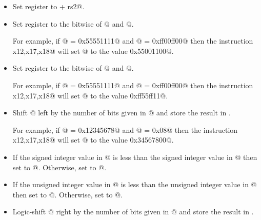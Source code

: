 \begin{itemize}
\item{}
\label{insn:add}

Set register \verb@rd@ to  + rs2@.

\item{}
\label{insn:and}

Set register \verb@rd@ to the bitwise \verb@and@ of @ and  @.

For example, if @ = \verb@0x55551111@ and @ = \verb@0xff00ff00@
then the instruction \verb@xor x12,x17,x18@ will set @ to the
value \verb@0x55001100@.

\item{}
\label{insn:or}

Set register \verb@rd@ to the bitwise \verb@or@ of @ and  @.

For example, if @ = \verb@0x55551111@ and @ = \verb@0xff00ff00@
then the instruction \verb@xor x12,x17,x18@ will set @ to the
value \verb@0xff55ff11@.

\item{}
\label{insn:sll}

Shift @ left by the number of bits given in @ and
store the result in \verb@rd@.

For example, if @ = \verb@0x12345678@ and @ = \verb@0x08@
then the instruction \verb@sll x12,x17,x18@ will set @ to the
value \verb@0x34567800@.

\item{}
\label{insn:slt}

If the signed integer value in @ is less than the
signed integer value in @ then set \verb@rd@ to @.
Otherwise, set \verb@rd@ to @.

\item{}
\label{insn:sltu}

If the unsigned integer value in @ is less than the
unsigned integer value in @ then set \verb@rd@ to @.
Otherwise, set \verb@rd@ to @.

\item{}
\label{insn:sra}

Logic-shift @ right by the number of bits given in @ and
store the result in \verb@rd@.


\end{itemize}
